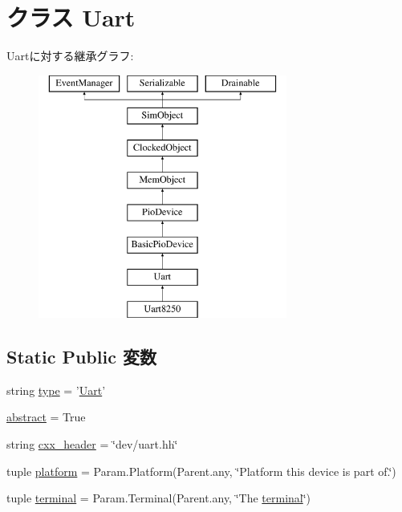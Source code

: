 \hypertarget{classUart_1_1Uart}{
\section{クラス Uart}
\label{classUart_1_1Uart}
}
Uartに対する継承グラフ:\begin{figure}[H]
\begin{center}
\leavevmode
\includegraphics[height=8cm]{classUart_1_1Uart}
\end{center}
\end{figure}
\subsection*{Static Public 変数}
\begin{DoxyCompactItemize}
\item 
string \hyperlink{classUart_1_1Uart_acce15679d830831b0bbe8ebc2a60b2ca}{type} = '\hyperlink{classUart_1_1Uart}{Uart}'
\item 
\hyperlink{classUart_1_1Uart_a17fa61ac3806b481cafee5593b55e5d0}{abstract} = True
\item 
string \hyperlink{classUart_1_1Uart_a17da7064bc5c518791f0c891eff05fda}{cxx\_\-header} = \char`\"{}dev/uart.hh\char`\"{}
\item 
tuple \hyperlink{classUart_1_1Uart_ae6d09ca44893db6cdb66d62deaa1aefd}{platform} = Param.Platform(Parent.any, \char`\"{}Platform this device is part of.\char`\"{})
\item 
tuple \hyperlink{classUart_1_1Uart_a36fbd7aa3e5bc702238c8fc439330d8f}{terminal} = Param.Terminal(Parent.any, \char`\"{}The \hyperlink{classUart_1_1Uart_a36fbd7aa3e5bc702238c8fc439330d8f}{terminal}\char`\"{})
\end{DoxyCompactItemize}



